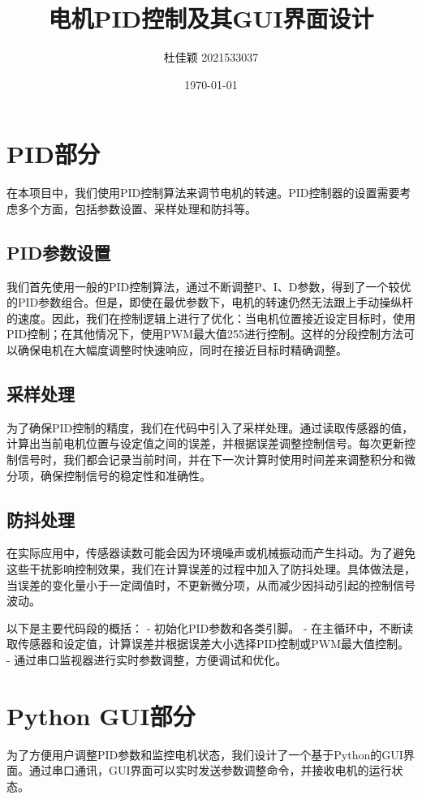 \documentclass{article}
\title{电机PID控制及其GUI界面设计}
\author{杜佳颖 2021533037}
\date{\today}
\begin{document}
\maketitle

\section{PID部分}
在本项目中，我们使用PID控制算法来调节电机的转速。PID控制器的设置需要考虑多个方面，包括参数设置、采样处理和防抖等。

\subsection{PID参数设置}
我们首先使用一般的PID控制算法，通过不断调整P、I、D参数，得到了一个较优的PID参数组合。但是，即使在最优参数下，电机的转速仍然无法跟上手动操纵杆的速度。因此，我们在控制逻辑上进行了优化：当电机位置接近设定目标时，使用PID控制；在其他情况下，使用PWM最大值255进行控制。这样的分段控制方法可以确保电机在大幅度调整时快速响应，同时在接近目标时精确调整。

\subsection{采样处理}
为了确保PID控制的精度，我们在代码中引入了采样处理。通过读取传感器的值，计算出当前电机位置与设定值之间的误差，并根据误差调整控制信号。每次更新控制信号时，我们都会记录当前时间，并在下一次计算时使用时间差来调整积分和微分项，确保控制信号的稳定性和准确性。

\subsection{防抖处理}
在实际应用中，传感器读数可能会因为环境噪声或机械振动而产生抖动。为了避免这些干扰影响控制效果，我们在计算误差的过程中加入了防抖处理。具体做法是，当误差的变化量小于一定阈值时，不更新微分项，从而减少因抖动引起的控制信号波动。

以下是主要代码段的概括：
- 初始化PID参数和各类引脚。
- 在主循环中，不断读取传感器和设定值，计算误差并根据误差大小选择PID控制或PWM最大值控制。
- 通过串口监视器进行实时参数调整，方便调试和优化。

\section{Python GUI部分}
为了方便用户调整PID参数和监控电机状态，我们设计了一个基于Python的GUI界面。通过串口通讯，GUI界面可以实时发送参数调整命令，并接收电机的运行状态。
\end{document}
